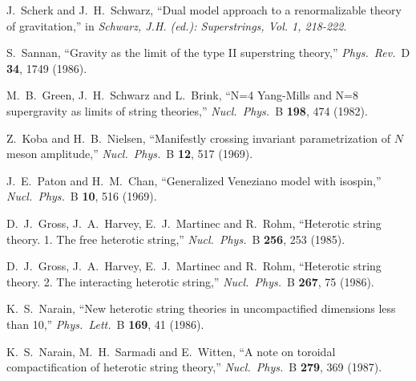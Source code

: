 \begin{thebibliography}{99}
J.~Scherk and J.~H.~Schwarz,
``Dual model approach to a renormalizable theory of gravitation,''
in {\it  Schwarz, J.H. (ed.): Superstrings, Vol. 1, 218-222}.

S.~Sannan,
``Gravity as the limit of the type II superstring theory,''
{\it Phys.\ Rev.}\ D {\bf 34}, 1749 (1986).

M.~B.~Green, J.~H.~Schwarz and L.~Brink,
``N=4 Yang-Mills and N=8 supergravity as limits of string theories,''
{\it Nucl.\ Phys.}\ B {\bf 198}, 474 (1982).

Z.~Koba and H.~B.~Nielsen,
``Manifestly crossing invariant parametrization of $N$ meson amplitude,''
{\it Nucl.\ Phys.}\ B {\bf 12}, 517 (1969).

J.~E.~Paton and H.~M.~Chan,
``Generalized Veneziano model with isospin,''
{\it Nucl.\ Phys.}\ B {\bf 10}, 516 (1969).

D.~J.~Gross, J.~A.~Harvey, E.~J.~Martinec and R.~Rohm,
``Heterotic string theory. 1. The free heterotic string,''
{\it Nucl.\ Phys.}\ B {\bf 256}, 253 (1985).

D.~J.~Gross, J.~A.~Harvey, E.~J.~Martinec and R.~Rohm,
``Heterotic string theory. 2. The interacting heterotic string,''
{\it Nucl.\ Phys.}\ B {\bf 267}, 75 (1986).

K.~S.~Narain,
``New heterotic string theories in uncompactified dimensions less than 10,''
{\it Phys.\ Lett.}\ B {\bf 169}, 41 (1986).

K.~S.~Narain, M.~H.~Sarmadi and E.~Witten,
``A note on toroidal compactification of heterotic string theory,''
{\it Nucl.\ Phys.}\ B {\bf 279}, 369 (1987).


\end{thebibliography}
